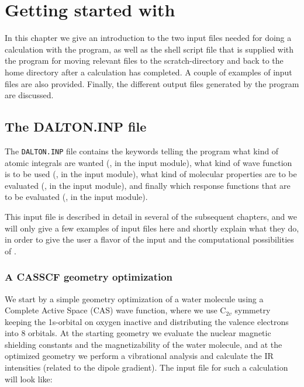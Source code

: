 \chapter{Getting started with {\dalton}}\label{ch:starting}

In this chapter we give an introduction to the two input files needed
for doing a calculation with the {\dalton} program, as well as the
shell script file that is supplied with the program for moving
relevant files to the scratch-directory and back to the home directory
after a calculation has completed. A couple of examples of
input files  are also provided. Finally, the different output files
generated by the program are discussed.

\section{The DALTON.INP file}\label{sec:daltoninp}

The \verb|DALTON.INP| file contains the keywords telling the program
what kind of atomic integrals are wanted
({\her}, in the  input module), what kind of wave
function is to be used ({\sir}, in the
 input
module), what kind of molecular properties  are
to be evaluated (\aba , in the  input module), and
finally which response functions that are to
be evaluated (\resp , in
the  input module).

This input file is described in detail in several of the subsequent chapters,
and we will  only give a few examples of input files here and shortly
explain what they do, in order to give the user a flavor of the input
and the computational possibilities
of {\dalton}.

\subsection{A CASSCF geometry optimization}

We start by a simple geometry optimization 
of a water molecule using a Complete 
Active Space (CAS) wave function, where we use C$_{2v}$ symmetry
keeping the 1s-orbital on oxygen inactive and distributing the valence
electrons  into 8 orbitals. At the starting geometry we
evaluate the nuclear magnetic shielding constants 
and the magnetizability of the water
molecule, and at the optimized geometry we perform a vibrational
analysis and calculate the IR
intensities 
(related to the dipole
gradient). The input file for such a calculation will look like:

